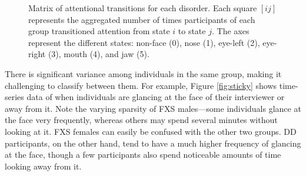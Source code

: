 \documentclass{llncs}
\begin{document}
\begin{figure}[h]
               \hfill   
               \hfill
\caption{Matrix of attentional transitions for each disorder. Each square $[ij]$ represents the aggregated number of times participants of each group transitioned attention from state $i$ to state $j$.  The axes represent the different states: non-face (0), nose (1), eye-left (2), eye-right (3), mouth (4), and jaw (5).}
\label{fig:transitions}
\end{figure}
There is significant variance among individuals in the same group, making it challenging to classify between them. For example, Figure \ref{fig:sticky} shows time-series data of when individuals are glancing at the face of their interviewer or away from it. Note the varying sparsity of FXS males---some individuals glance at the face very frequently, whereas others may spend several minutes without looking at it. FXS females can easily be confused with the other two groups. DD participants, on the other hand, tend to have a much higher frequency of glancing at the face, though a few participants also spend noticeable amounts of time looking away from it. 
\end{document}
